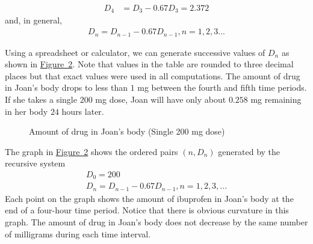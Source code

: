 \documentclass[10pt,]{book}
\theoremstyle{ptxdefinitionnotitle}
\theoremstyle{ptxdefinitiontitle}
\theoremstyle{ptxdefinitionnotitle}
\theoremstyle{ptxdefinitiontitle}
\theoremstyle{ptxdefinitionnotitle}
\theoremstyle{ptxdefinitiontitle}
\numberwithin{equation}{section}
\newcommand{\amp}{&}
\begin{document}
\begin{example}
\begin{align*}
D_4 \amp = D_3-0.67D_3 = 2.372
\end{align*}
and, in general,%
\begin{gather*}
D_n=D_{n-1}-0.67D_{n-1},n=1,2,3...
\end{gather*}
%
\par
\hypertarget{p-11}{}%
Using a spreadsheet or calculator, we can generate successive values of \(D_n\) as shown in \hyperref[figure-ibuprofen-one-dose]{Figure~2}.  Note that values in the table are rounded to three decimal places but that exact values were used in all computations. The amount of drug in Joan's body drops to less than \(1\) mg between the fourth and fifth time periods.  If she takes a single \(200\) mg dose, Joan will have only about \(0.258\) mg remaining in her body \(24\) hours later.%
\begin{figure}
\centering
\begin{sidebyside}{2}{0.0375}{0.0375}{0.075}
\begin{sbspanel}{0.2}
\end{sbspanel}
\begin{sbspanel}{0.65}
\end{sbspanel}
\end{sidebyside}
\caption{Amount of drug in Joan's body (Single 200 mg dose)\label{figure-ibuprofen-one-dose}}
\end{figure}
\hypertarget{p-12}{}%
The graph in \hyperref[figure-ibuprofen-one-dose]{Figure~2} shows the ordered pairs \((n,D_n)\) generated by the recursive system%
%
\begin{gather*}
D_0=200\\
D_n=D_{n-1} - 0.67D_{n-1}, n=1,2,3,...
\end{gather*}
\hypertarget{p-13}{}%
Each point on the graph shows the amount of ibuprofen in Joan’s body at the end of a four-hour time period. Notice that there is obvious curvature in this graph.  The amount of drug in Joan’s body does not decrease by the same number of milligrams during each time interval.%
\end{example}
\typeout{************************************************}
\typeout{************************************************}
\end{document}
